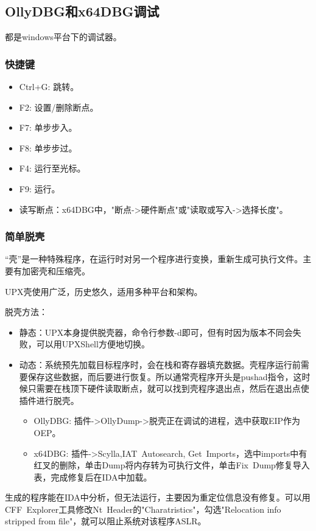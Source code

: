 \subsection{OllyDBG和x64DBG调试}
都是windows平台下的调试器。
\subsubsection*{快捷键}
\begin{itemize}
    \item Ctrl+G: 跳转。
    \item F2: 设置/删除断点。
    \item F7: 单步步入。
    \item F8: 单步步过。
    \item F4: 运行至光标。
    \item F9: 运行。
    \item 读写断点：x64DBG中，"断点->硬件断点"或"读取或写入->选择长度"。
\end{itemize}

\subsubsection*{简单脱壳}
“壳”是一种特殊程序，在运行时对另一个程序进行变换，重新生成可执行文件。主要有加密壳和压缩壳。

UPX壳使用广泛，历史悠久，适用多种平台和架构。

脱壳方法：
\begin{itemize}
    \item 静态：UPX本身提供脱壳器，命令行参数-d即可，但有时因为版本不同会失败，可以用UPXShell方便地切换。
    \item 动态：系统预先加载目标程序时，会在栈和寄存器填充数据。壳程序运行前需要保存这些数据，而后要进行恢复。所以通常壳程序开头是pushad指令，这时候只需要在栈顶下硬件读取断点，就可以找到壳程序退出点，然后在退出点使插件进行脱壳。
    \begin{itemize}
        \item OllyDBG: 插件->OllyDump->脱壳正在调试的进程，选中获取EIP作为OEP。
        \item x64DBG: 插件->Scylla,IAT\ Autosearch, Get\ Imports，选中imports中有红叉的删除，单击Dump将内存转为可执行文件，单击Fix\ Dump修复导入表，完成修复后在IDA中加载。
    \end{itemize}
\end{itemize}
生成的程序能在IDA中分析，但无法运行，主要因为重定位信息没有修复。可以用CFF\ Explorer工具修改Nt\ Header的"Charatristics"，勾选"Relocation info stripped from file"，就可以阻止系统对该程序ASLR。

